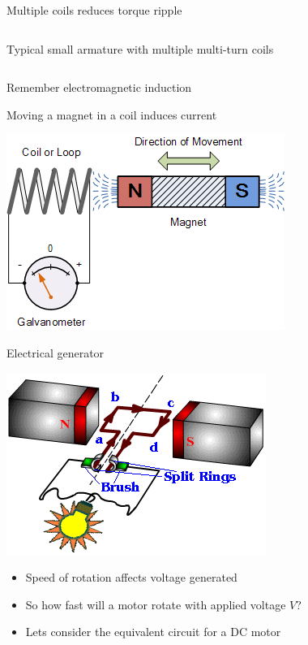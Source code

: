 \documentclass[compress]{beamer}
\begin{document}
\begin{frame}{Multiple coils reduces torque ripple}
\begin{columns}
\begin{column}{0.5\linewidth}
\begin{center}
                Typical small armature with multiple multi-turn coils
            \end{center}
        \end{column}
    \end{columns}


\end{frame}

\begin{frame}{Remember electromagnetic induction}

  Moving a magnet in a coil induces current


    \begin{center}
        \includegraphics[width=0.6\linewidth]{image29}


    \end{center}
\end{frame}

\begin{frame}{Electrical generator}

    \begin{center}
        \includegraphics[width=0.6\linewidth]{image30}
    \end{center}

\begin{itemize}

\item Speed of rotation affects voltage generated
\item So how fast will a motor rotate with applied voltage $V$?
\item Lets consider the equivalent circuit for a DC motor
\end{itemize}
\end{frame}
\end{document}
